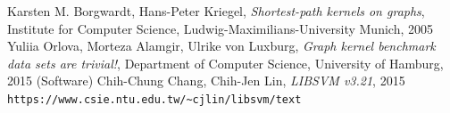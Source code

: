 \documentclass{article}
\begin{document}
\renewcommand\refname{Referencer}
\begin{thebibliography}{9}
	Karsten M. Borgwardt, Hans-Peter Kriegel, 
	\emph{Shortest-path kernels on graphs},
	Institute for Computer Science, Ludwig-Maximilians-University Munich, 2005
	Yuliia Orlova, Morteza Alamgir, Ulrike von Luxburg, \textit{Graph kernel benchmark data sets are trivial!}, Department of Computer Science, University of Hamburg, 2015
	(Software) Chih-Chung Chang, Chih-Jen Lin, \textit{LIBSVM v3.21}, 2015\\ \verb|https://www.csie.ntu.edu.tw/~cjlin/libsvm/text|
\end{thebibliography}
\end{document}

